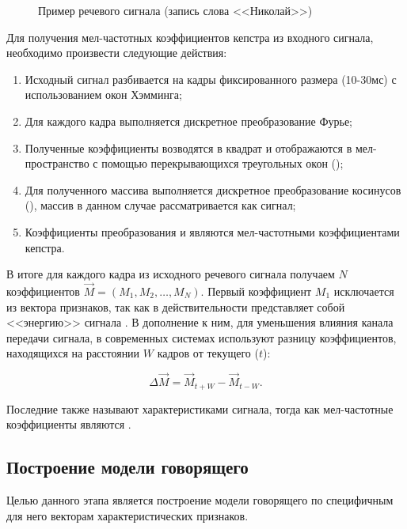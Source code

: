 \begin{figure}
\caption{Пример речевого сигнала (запись слова <<Николай>>)}
\label{fig:waveform}
\end{figure}

Для получения мел-частотных коэффициентов кепстра из входного сигнала, необходимо произвести следующие действия:

\begin{enumerate}
\item Исходный сигнал разбивается на кадры фиксированного размера (10-30мс) с использованием окон Хэмминга;
\item Для каждого кадра выполняется дискретное преобразование Фурье;
\item Полученные коэффициенты возводятся в квадрат и отображаются в мел-пространство с помощью перекрывающихся треугольных окон ();
\item Для полученного массива выполняется дискретное преобразование косинусов (), массив в данном случае рассматривается как сигнал;
\item Коэффициенты преобразования и являются мел-частотными коэффициентами кепстра.
\end{enumerate}

В итоге для каждого кадра из исходного речевого сигнала получаем $N$ коэффициентов $\vec M = (M_1, M_2, \ldots, M_N)$. Первый коэффициент $M_1$ исключается из вектора признаков, так как в действительности представляет собой <<энергию>> сигнала \cite{Reynolds95gmm}. В дополнение к ним, для уменьшения влияния канала передачи сигнала, в современных системах используют \cite{Reynolds95gmm} разницу коэффициентов, находящихся на расстоянии $W$ кадров от текущего ($t$):

\begin{equation}
\Delta \vec M = \vec M_{t+W} - \vec M_{t-W}.
\end{equation}

Последние также называют  характеристиками сигнала, тогда как мел-частотные коэффициенты являются .

\subsection{Построение модели говорящего}

Целью данного этапа является построение модели говорящего по специфичным для него векторам характеристических признаков.

